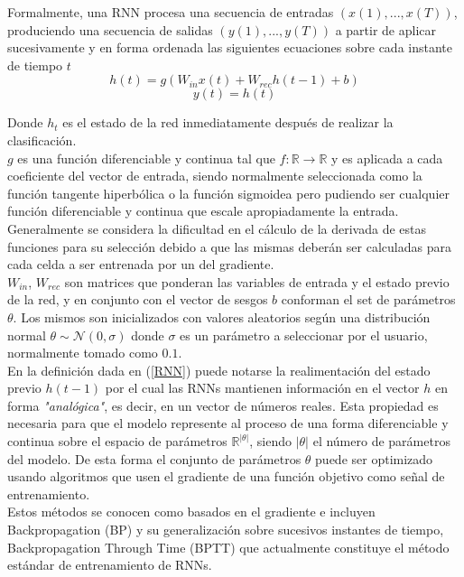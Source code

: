 \documentclass{article}
\begin{document}
	Formalmente, una RNN procesa una secuencia de entradas \textit{$(x(1) , ... , x(T))$}, produciendo una secuencia de salidas \textit{ $(y(1), ... , y(T))$} a partir de aplicar sucesivamente y en forma ordenada las siguientes ecuaciones sobre cada instante de tiempo $t$ 
	\begin{equation}\label{RNN}
	h(t) = g( W_{in} x(t) + W_{rec} h(t-1) + b )
	\end{equation}
	\begin{equation*}
	y(t) = h(t)
	\end{equation*}
	
	Donde $h_{t}$ es el estado de la red inmediatamente después de realizar la clasificación. \\
	$g$ es una función diferenciable y continua tal que $f: \mathbb{R} \rightarrow \mathbb{R}$ y es aplicada a cada coeficiente del vector de entrada, siendo normalmente seleccionada como la función tangente hiperbólica o la función sigmoidea pero pudiendo ser cualquier función diferenciable y continua que escale apropiadamente la entrada. \\
	Generalmente se considera la dificultad en el cálculo de la derivada de estas funciones para su selección debido a que las mismas deberán ser calculadas para cada celda a ser entrenada por un del gradiente.\\
	$W_{in}$, $W_{rec}$ son matrices que ponderan las variables de entrada y el estado previo de la red, y en conjunto con el vector de sesgos $b$ conforman el set de parámetros $\theta$. Los mismos son inicializados con valores aleatorios según una distribución normal $\theta \sim \mathcal{N}(0,\sigma)$ donde $\sigma$ es un parámetro a seleccionar por el usuario, normalmente tomado como $0.1$.\\
	
	En la definición dada en (\ref{RNN}) puede notarse la realimentación del estado previo $h(t-1)$ por el cual las RNNs mantienen información en el vector $h$ en forma \textit{"analógica"}, es decir, en un vector de números reales. Esta propiedad es necesaria para que el modelo represente al proceso de una forma diferenciable y continua sobre el espacio de parámetros $\mathbb{R}^{|\theta|}$, siendo $|\theta|$ el número de parámetros del modelo. 
	De esta forma el conjunto de parámetros $\theta$ puede ser optimizado usando algoritmos que usen el gradiente de una función objetivo como señal de entrenamiento. \\
	Estos métodos se conocen como basados en el gradiente\cite{20SutskeverPhdThesis} e incluyen Backpropagation (BP) y su generalización sobre sucesivos instantes de tiempo, Backpropagation Through Time (BPTT) que actualmente constituye el método estándar de entrenamiento de RNNs.\\
	
\end{document}
